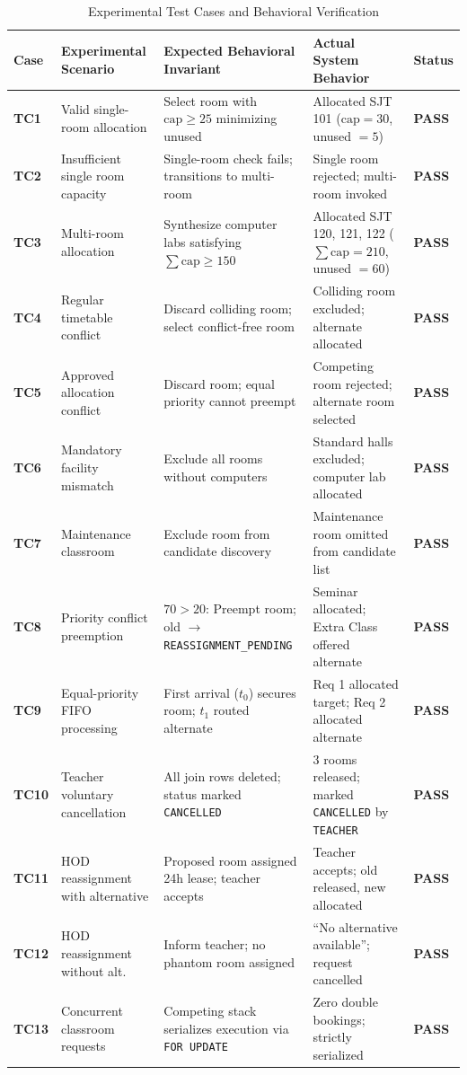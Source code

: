 \documentclass[conference]{IEEEtran}
\begin{document}
\begin{table}[t]
\caption{Experimental Test Cases and Behavioral Verification}
\label{tab:test_cases}
\centering
\small
\begin{tabular}{p{0.8cm} p{3.2cm} p{5.5cm} p{5.5cm} p{1.0cm}}
\toprule
\textbf{Case} & \textbf{Experimental Scenario} & \textbf{Expected Behavioral Invariant} & \textbf{Actual System Behavior} & \textbf{Status} \\
\midrule
\textbf{TC1} & Valid single-room allocation & Select room with $\text{cap} \ge 25$ minimizing unused & Allocated SJT 101 ($\text{cap}=30$, unused $=5$) & \textbf{PASS} \\
\textbf{TC2} & Insufficient single room capacity & Single-room check fails; transitions to multi-room & Single room rejected; multi-room invoked & \textbf{PASS} \\
\textbf{TC3} & Multi-room allocation & Synthesize computer labs satisfying $\sum \text{cap} \ge 150$ & Allocated SJT 120, 121, 122 ($\sum \text{cap}=210$, unused $=60$) & \textbf{PASS} \\
\textbf{TC4} & Regular timetable conflict & Discard colliding room; select conflict-free room & Colliding room excluded; alternate allocated & \textbf{PASS} \\
\textbf{TC5} & Approved allocation conflict & Discard room; equal priority cannot preempt & Competing room rejected; alternate room selected & \textbf{PASS} \\
\textbf{TC6} & Mandatory facility mismatch & Exclude all rooms without computers & Standard halls excluded; computer lab allocated & \textbf{PASS} \\
\textbf{TC7} & Maintenance classroom & Exclude room from candidate discovery & Maintenance room omitted from candidate list & \textbf{PASS} \\
\textbf{TC8} & Priority conflict preemption & $70 > 20$: Preempt room; old $\to$ \texttt{REASSIGNMENT\_PENDING} & Seminar allocated; Extra Class offered alternate & \textbf{PASS} \\
\textbf{TC9} & Equal-priority FIFO processing & First arrival ($t_0$) secures room; $t_1$ routed alternate & Req 1 allocated target; Req 2 allocated alternate & \textbf{PASS} \\
\textbf{TC10} & Teacher voluntary cancellation & All join rows deleted; status marked \texttt{CANCELLED} & 3 rooms released; marked \texttt{CANCELLED} by \texttt{TEACHER} & \textbf{PASS} \\
\textbf{TC11} & HOD reassignment with alternative & Proposed room assigned 24h lease; teacher accepts & Teacher accepts; old released, new allocated & \textbf{PASS} \\
\textbf{TC12} & HOD reassignment without alt. & Inform teacher; no phantom room assigned & ``No alternative available''; request cancelled & \textbf{PASS} \\
\textbf{TC13} & Concurrent classroom requests & Competing stack serializes execution via \texttt{FOR UPDATE} & Zero double bookings; strictly serialized & \textbf{PASS} \\
\bottomrule
\end{tabular}
\end{table}
\end{document}
